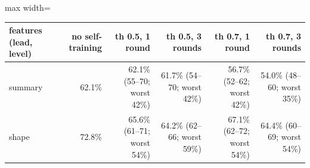 \begin{adjustbox}{max width=\textwidth}
{\footnotesize
\begin{tabular}{lrrrrr}
\toprule
\textbf{features (lead, level)} & \textbf{no self-training} & \textbf{th 0.5, 1 round} & \textbf{th 0.5, 3 rounds} & \textbf{th 0.7, 1 round} & \textbf{th 0.7, 3 rounds} \\
\midrule
summary & 62.1\% & 62.1\% (55--70; worst 42\%) & 61.7\% (54--70; worst 42\%) & 56.7\% (52--62; worst 42\%) & 54.0\% (48--60; worst 35\%) \\
shape & 72.8\% & 65.6\% (61--71; worst 54\%) & 64.2\% (62--66; worst 59\%) & 67.1\% (62--72; worst 54\%) & 64.4\% (60--69; worst 54\%) \\
\bottomrule
\end{tabular}
}
\end{adjustbox}
